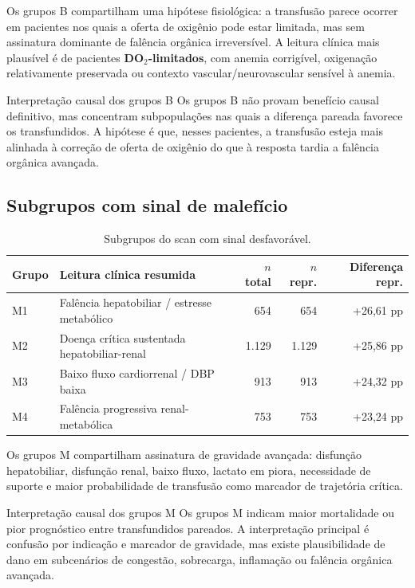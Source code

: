 Os grupos B compartilham uma hipótese fisiológica: a transfusão parece ocorrer em pacientes nos quais a oferta de oxigênio pode estar limitada, mas sem assinatura dominante de falência orgânica irreversível. A leitura clínica mais plausível é de pacientes \textbf{DO$_2$-limitados}, com anemia corrigível, oxigenação relativamente preservada ou contexto vascular/neurovascular sensível à anemia.

\begin{boxbenefit}{Interpretação causal dos grupos B}
Os grupos B não provam benefício causal definitivo, mas concentram subpopulações nas quais a diferença pareada favorece os transfundidos. A hipótese é que, nesses pacientes, a transfusão esteja mais alinhada à correção de oferta de oxigênio do que à resposta tardia a falência orgânica avançada.
\end{boxbenefit}

\subsection{Subgrupos com sinal de malefício}

\begin{table}[ht]
\centering
\caption{Subgrupos do scan com sinal desfavorável.}
\begin{tabular}{llrrr}
\toprule
Grupo & Leitura clínica resumida & $n$ total & $n$ repr. & Diferença repr. \\
\midrule
M1 & Falência hepatobiliar / estresse metabólico & 654 & 654 & +26,61 pp \\
M2 & Doença crítica sustentada hepatobiliar-renal & 1.129 & 1.129 & +25,86 pp \\
M3 & Baixo fluxo cardiorrenal / DBP baixa & 913 & 913 & +24,32 pp \\
M4 & Falência progressiva renal-metabólica & 753 & 753 & +23,24 pp \\
\bottomrule
\end{tabular}
\end{table}

Os grupos M compartilham assinatura de gravidade avançada: disfunção hepatobiliar, disfunção renal, baixo fluxo, lactato em piora, necessidade de suporte e maior probabilidade de transfusão como marcador de trajetória crítica.

\begin{boxharm}{Interpretação causal dos grupos M}
Os grupos M indicam maior mortalidade ou pior prognóstico entre transfundidos pareados. A interpretação principal é confusão por indicação e marcador de gravidade, mas existe plausibilidade de dano em subcenários de congestão, sobrecarga, inflamação ou falência orgânica avançada.
\end{boxharm}

